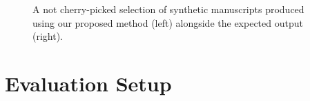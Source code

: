 \documentclass{beamer}
\begin{document}
\begin{frame}
\begin{figure}[!htpb]
\\
\hspace*{0.4in} %
\\
\addtocounter{subfigure}{-8}
\hspace*{0.4in} %


\caption{A not cherry-picked selection of synthetic manuscripts produced using our proposed method (left) alongside the expected output (right).} \label{fig:resultingsamples}
\end{figure}
\end{frame}



\section{Evaluation Setup}
\end{document}
